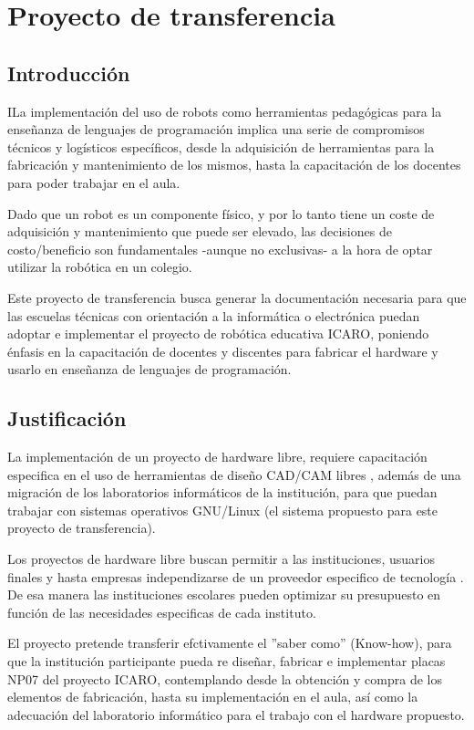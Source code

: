\chapter{Proyecto de transferencia}

\section{Introducción}

ILa implementación del uso de robots como herramientas pedagógicas para la enseñanza de lenguajes de programación implica una serie de compromisos técnicos y logísticos específicos, desde la adquisición de herramientas para la fabricación y mantenimiento de los mismos, hasta la capacitación de los docentes para poder trabajar en el aula.

Dado que un robot es un componente físico, y por lo tanto tiene un coste de adquisición y mantenimiento que puede ser elevado, las decisiones de costo/beneficio son fundamentales -aunque no exclusivas- a la hora de optar utilizar la robótica en un colegio.

Este proyecto de transferencia busca generar la documentación necesaria para que las escuelas técnicas con orientación a la informática o electrónica puedan adoptar e implementar el proyecto de robótica educativa ICARO, poniendo énfasis en la capacitación de docentes y discentes para fabricar el hardware y usarlo en enseñanza de lenguajes de programación.


\section{Justificación}

La implementación de un proyecto de hardware libre, requiere capacitación  especifica en el uso de herramientas de diseño CAD/CAM libres \citep{bareno2011metodologia}, además de una migración de los laboratorios informáticos de la institución, para que puedan trabajar con sistemas operativos GNU/Linux (el sistema propuesto para este proyecto de transferencia).

Los proyectos de hardware libre buscan permitir a las instituciones, usuarios finales y hasta empresas independizarse de un proveedor especifico de tecnología \citep{gonzalez_hardware_2003}. De esa manera las instituciones escolares pueden optimizar su presupuesto en función de las necesidades especificas de cada instituto.

El proyecto pretende transferir efctivamente el ''saber como'' (Know-how), para que la institución participante pueda re diseñar, fabricar e implementar placas NP07 del proyecto ICARO, contemplando desde la obtención y compra de los elementos de fabricación, hasta su implementación en el aula, así como la adecuación del laboratorio informático para el trabajo con el hardware propuesto.
 
